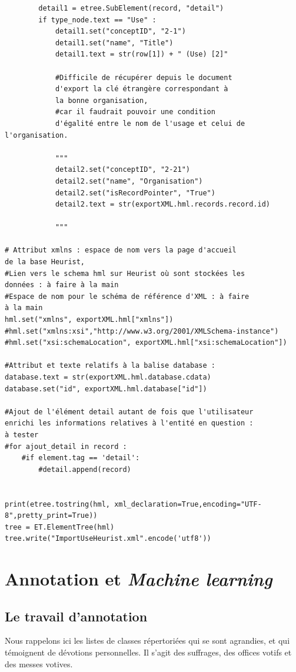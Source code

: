 \documentclass[a4paper,12pt,twoside]{book}
\begin{document}
\begin{verbatim}
        detail1 = etree.SubElement(record, "detail")
        if type_node.text == "Use" :
            detail1.set("conceptID", "2-1")
            detail1.set("name", "Title")
            detail1.text = str(row[1]) + " (Use) [2]"

            #Difficile de récupérer depuis le document
            d'export la clé étrangère correspondant à 
            la bonne organisation,
            #car il faudrait pouvoir une condition 
            d'égalité entre le nom de l'usage et celui de l'organisation.

            """
            detail2.set("conceptID", "2-21")
            detail2.set("name", "Organisation")
            detail2.set("isRecordPointer", "True")
            detail2.text = str(exportXML.hml.records.record.id)

            """

# Attribut xmlns : espace de nom vers la page d'accueil 
de la base Heurist,
#Lien vers le schema hml sur Heurist où sont stockées les
données : à faire à la main
#Espace de nom pour le schéma de référence d'XML : à faire 
à la main
hml.set("xmlns", exportXML.hml["xmlns"])
#hml.set("xmlns:xsi","http://www.w3.org/2001/XMLSchema-instance")
#hml.set("xsi:schemaLocation", exportXML.hml["xsi:schemaLocation"])

#Attribut et texte relatifs à la balise database :
database.text = str(exportXML.hml.database.cdata)
database.set("id", exportXML.hml.database["id"])

#Ajout de l'élément detail autant de fois que l'utilisateur 
enrichi les informations relatives à l'entité en question : 
à tester
#for ajout_detail in record :
	#if element.tag == 'detail':
		#detail.append(record)


print(etree.tostring(hml, xml_declaration=True,encoding="UTF-8",pretty_print=True))
tree = ET.ElementTree(hml)
tree.write("ImportUseHeurist.xml".encode('utf8'))
    \end{verbatim}

	
	\chapter{Annotation et \textit{Machine learning}}
	
	\section{\label{annotation}Le travail d'annotation}
	
	Nous rappelons ici les listes de classes répertoriées qui se sont agrandies, et qui témoignent de dévotions personnelles. Il s'agit des suffrages, des offices votifs et des messes votives. 
	
\end{document}
